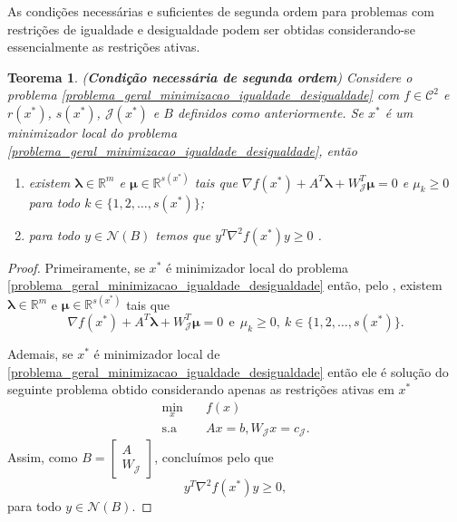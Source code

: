 \documentclass[12pt,a4paper]{scrartcl}
\def\RR{\mathds{R}}
\newtheorem{teo}{Teorema}
\theoremstyle{definition}%
\begin{document}
As condições necessárias e suficientes de segunda ordem para problemas com restrições de igualdade e desigualdade podem ser obtidas considerando-se essencialmente as restrições ativas.

\begin{teo}(\textbf{Condição necessária de segunda ordem}) \label{teo:condicao_necessaria_2ordem_igualdade_desigualdade}
Considere o problema \eqref{problema_geral_minimizacao_igualdade_desigualdade} com $f \in \mathcal{C}^{2}$ e $r(x^{*})$, $s(x^{*})$, $\mathcal{J}(x^{*})$ e $B$ definidos como anteriormente. Se $x^{*}$ é um minimizador local do problema \eqref{problema_geral_minimizacao_igualdade_desigualdade}, então
\begin{enumerate}
	\item[(i)] existem $\boldsymbol{\lambda} \in \RR^{m}$ e $\boldsymbol{\mu} \in \RR^{s(x^{*})}$ tais que $\nabla f(x^{*}) + A^{T}\boldsymbol{\lambda} + W^{T}_{\mathcal{J}} \boldsymbol{\mu} =0$ e $\mu_{k} \geq 0$ para todo $k\in \{ 1,2, \ldots , s(x^{*}) \}$;
	\item[(ii)] para todo $y\in \mathcal{N}(B)$ temos que $y^{T}\nabla^{2} f(x^{*})y \geq 0$ .
\end{enumerate}	
\end{teo}
\begin{proof}
Primeiramente, se $x^{*}$ é minimizador local do problema \eqref{problema_geral_minimizacao_igualdade_desigualdade} então, pelo , existem $\boldsymbol{\lambda} \in \RR^{m}$ e $\boldsymbol{\mu} \in \RR^{s(x^{*})}$ tais que
\[
\nabla f(x^{*}) + A^{T}\boldsymbol{\lambda} + W^{T}_{\mathcal{J}} \boldsymbol{\mu} =0 \ \ \text{e} \ \ \mu_{k} \geq 0, \ k\in \{ 1,2, \ldots , s(x^{*}) \} .
\]

Ademais, se $x^{*}$ é minimizador local de \eqref{problema_geral_minimizacao_igualdade_desigualdade} então ele é solução do seguinte problema obtido considerando apenas as restrições ativas em $x^{*}$
\[
\begin{aligned}
\min_{x} & \quad f(x) \\
\text{s.a} & \quad Ax=b, W_{\mathcal{J}}x = c_{\mathcal{J}} .
\end{aligned}
\]
Assim, como $B = \begin{bmatrix*} A \\ W_{\mathcal{J}} \end{bmatrix*}$, concluímos pelo  que 
\[
y^{T}\nabla^{2} f(x^{*})y \geq 0 ,
\] 
para todo $y\in \mathcal{N}(B)$.
\end{proof}
\end{document}
